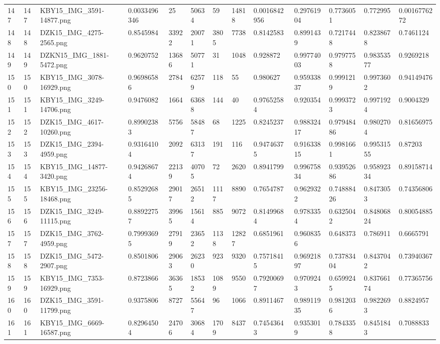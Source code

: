 \documentclass[11pt, a4paper, twoside]{report}
\begin{document}
\begin{longtable}[c]{@{}lllllllllllll@{}}
147 & 147 & KBY15\_IMG\_3591-14877.png & 0.0033496346 & 25 & 50634 & 59 & 14818 & 0.0016842956 & 0.29761904 & 0.7736051 & 0.772995 & 0.0016776272 \\
148 & 148 & DZK15\_IMG\_4275-2565.png & 0.8545984 & 33922 & 20071 & 3805 & 7738 & 0.8142583 & 0.8991439 & 0.7217448 & 0.8238678 & 0.7461124 \\
149 & 149 & DZKN15\_IMG\_1881-5472.png & 0.9620752 & 13686 & 50771 & 31 & 1048 & 0.928872 & 0.99774003 & 0.9797758 & 0.98353577 & 0.9269218 \\
150 & 150 & KBY15\_IMG\_3078-16929.png & 0.96986586 & 2784 & 62579 & 118 & 55 & 0.980627 & 0.95933837 & 0.9991219 & 0.9973602 & 0.94149476 \\
151 & 151 & KBY15\_IMG\_3249-14706.png & 0.9476082 & 1664 & 63688 & 144 & 40 & 0.97652584 & 0.920354 & 0.9993723 & 0.9971924 & 0.9004329 \\
152 & 152 & DZK15\_IMG\_4617-10260.png & 0.89902383 & 5756 & 58487 & 68 & 1225 & 0.8245237 & 0.98832417 & 0.97948486 & 0.9802704 & 0.81656975 \\
153 & 153 & DZK15\_IMG\_2394-4959.png & 0.93164104 & 2092 & 63137 & 191 & 116 & 0.94746375 & 0.91633815 & 0.9981661 & 0.99531555 & 0.87203 \\
154 & 154 & KBY15\_IMG\_14877-3420.png & 0.94268674 & 22139 & 40705 & 72 & 2620 & 0.8941799 & 0.99675834 & 0.93952686 & 0.95892334 & 0.89158714 \\
155 & 155 & KBY15\_IMG\_23256-18468.png & 0.85292685 & 29017 & 26512 & 1117 & 8890 & 0.7654787 & 0.9629322 & 0.74888426 & 0.8473053 & 0.74356806 \\
156 & 156 & DZK15\_IMG\_3249-11115.png & 0.88922757 & 39965 & 15614 & 885 & 9072 & 0.81499684 & 0.9783354 & 0.6325042 & 0.84806824 & 0.80054885 \\
157 & 157 & DZK15\_IMG\_3762-4959.png & 0.79993695 & 27919 & 23652 & 1138 & 12827 & 0.6851961 & 0.9608356 & 0.648373 & 0.786911 & 0.6665791 \\
158 & 158 & DZK15\_IMG\_5472-2907.png & 0.8501806 & 29063 & 26230 & 923 & 9320 & 0.75718415 & 0.96921897 & 0.73783404 & 0.8437042 & 0.73940367 \\
159 & 159 & KBY15\_IMG\_7353-16929.png & 0.8723866 & 36365 & 18532 & 1089 & 9550 & 0.79200697 & 0.9709243 & 0.6599245 & 0.83766174 & 0.77365756 \\
160 & 160 & DZK15\_IMG\_3591-11799.png & 0.9375806 & 8727 & 55647 & 96 & 1066 & 0.8911467 & 0.98911935 & 0.9812036 & 0.9822693 & 0.8824957 \\
161 & 161 & KBY15\_IMG\_6669-16587.png & 0.82964504 & 24706 & 30684 & 1709 & 8437 & 0.74543643 & 0.9353019 & 0.7843358 & 0.8451843 & 0.7088833 \\

\end{longtable}
\end{document}
